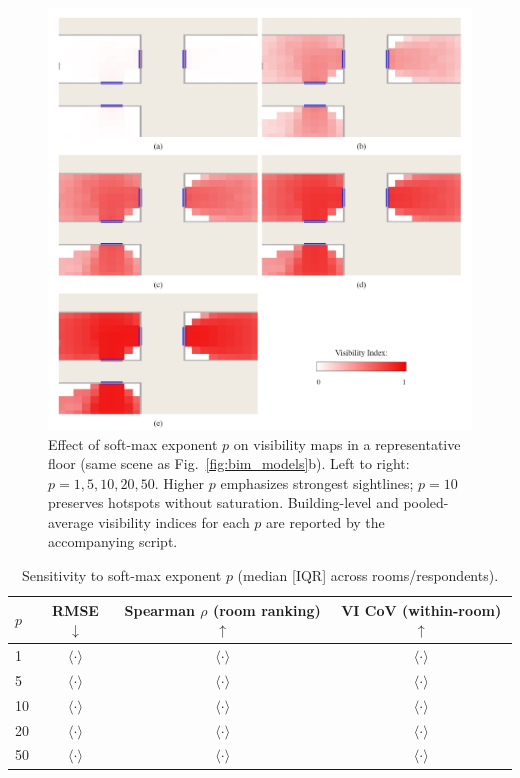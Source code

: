 \documentclass[final,3p,times,review]{elsarticle}
\begin{document}
\begin{figure}[H]
    \centering
    \includegraphics[width=1\textwidth]{P-value-impacts.jpg} %
    \caption{Effect of soft-max exponent $p$ on visibility maps in a representative floor (same scene as Fig.~\ref{fig:bim_models}b). Left to right: $p{=}1,5,10,20,50$. Higher $p$ emphasizes strongest sightlines; $p{=}10$ preserves hotspots without saturation. Building-level and pooled-average visibility indices for each $p$ are reported by the accompanying script.}
    \label{fig:p-sweep-heatmaps}
\end{figure}

\begin{table}[H]
\centering
\caption{Sensitivity to soft-max exponent $p$ (median [IQR] across rooms/respondents).}
\label{tab:p-sweep}
\begin{tabular}{@{}lccc@{}}
\toprule
$p$ & RMSE $\downarrow$ & Spearman $\rho$ (room ranking) $\uparrow$ & VI CoV (within-room) $\uparrow$ \\
\midrule
1  & $\langle\cdot\rangle$ & $\langle\cdot\rangle$ & $\langle\cdot\rangle$ \\
5  & $\langle\cdot\rangle$ & $\langle\cdot\rangle$ & $\langle\cdot\rangle$ \\
10 & $\langle\cdot\rangle$ & $\langle\cdot\rangle$ & $\langle\cdot\rangle$ \\
20 & $\langle\cdot\rangle$ & $\langle\cdot\rangle$ & $\langle\cdot\rangle$ \\
50 & $\langle\cdot\rangle$ & $\langle\cdot\rangle$ & $\langle\cdot\rangle$ \\
\bottomrule
\end{tabular}
\end{table}
\end{document}
